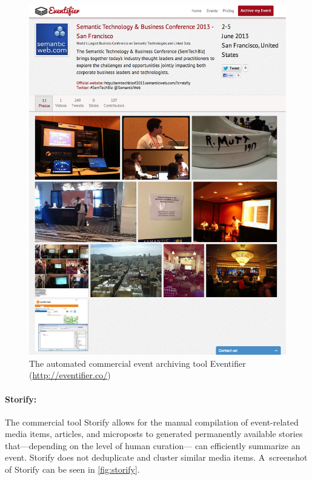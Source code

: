 \begin{figure}
  \centering
  \includegraphics[width=\linewidth]{eventifier.png}
  \caption[The automated commercial event archiving tool Eventifier]{The automated commercial event archiving tool Eventifier
    (\url{http://eventifier.co/})}
  \label{fig:eventifier}
\end{figure}

\paragraph{Storify:}

The commercial tool Storify allows for the manual compilation of
event-related media items, articles, and microposts
to generated permanently available stories
that---depending on the level of human curation---%
can efficiently summarize an event.
Storify does not deduplicate and cluster
similar media items.
A~screenshot of Storify can be seen in \autoref{fig:storify}.

